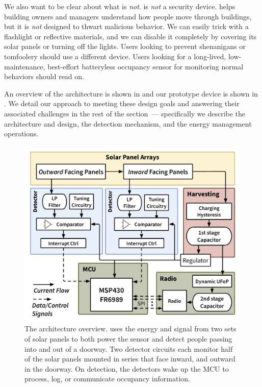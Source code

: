 We also want to be clear about what \sysname is \emph{not}.
\sysname is \emph{not} a security device.
\sysname helps building owners and managers understand how people move through buildings, but it is \emph{not} designed to thwart malicious behavior.
We can easily trick \sysname with a flashlight or reflective materials, and we can disable it completely by covering its solar panels or turning off the lights.
Users looking to prevent shenanigans or tomfoolery should use a different device.
Users looking for a long-lived, low-maintenance, best-effort batteryless occupancy sensor for monitoring normal behaviors should read on.

An overview of the \sysname architecture is shown in  and our \sysname prototype device is shown in .
We detail our approach to meeting these design goals and answering their associated challenges in the rest of the section~--- specifically we describe the \sysname architecture and design, the detection mechanism, and the energy management operations.


\begin{figure}[t]
\centering
\includegraphics[width=0.75\columnwidth]{figs/overview.pdf}
\caption{The \sysname architecture overview. \sysname uses the energy and signal from two sets of solar panels to both power the sensor and detect people passing into and out of a doorway. Two detector circuits each monitor half of the solar panels mounted in series that face inward, and outward in the doorway. On detection, the detectors wake up the MCU to process, log, or communicate occupancy information.  \label{fig:overview}}
\end{figure}


